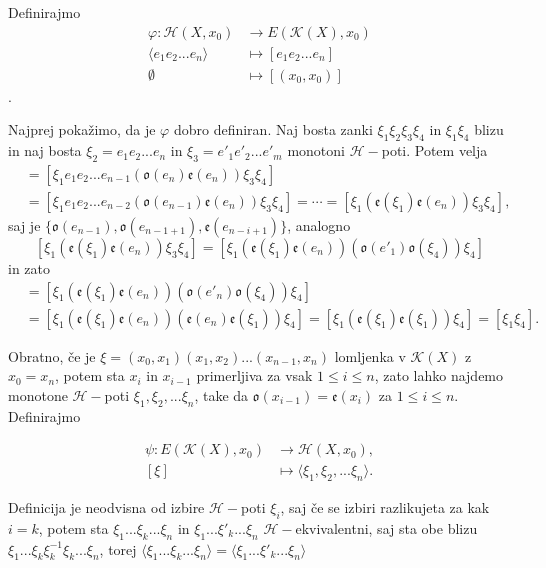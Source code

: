 \documentclass[mat1]{fmfdelo}
\DeclareRobustCommand{\k}{
    \mathcal{K}
}
\DeclareRobustCommand{\h}{
    \mathcal{H}
}
\begin{document}
\begin{dokaz}
    Definirajmo 
    \begin{align*}
\varphi:\mathscr{H}(X,x_0)&\rightarrow E(\k(X),x_0)\\
\langle e_1e_2...e_n\rangle&\mapsto [e_1e_2...e_n]\\
\emptyset &\mapsto [(x_0,x_0)]
    \end{align*}.

    Najprej pokažimo, da je $\varphi$ dobro definiran.
    Naj bosta zanki $\xi_1 \xi_2 \xi_3 \xi_4$ in $\xi_1 \xi_4 $ blizu in naj bosta $\xi_2 = e_1e_2...e_n$ in $\xi_3 = e'_1e'_2...e'_m$ monotoni $\h-$poti. Potem velja 
\begin{align*}
    [\xi_1 \xi_2 \xi_3 \xi_4]&=[\xi_1 e_1e_2...e_{n-1}(\mathfrak{o}(e_n)\mathfrak{e}(e_n)) \xi_3 \xi_4]\\
    &=[\xi_1 e_1e_2...e_{n-2}(\mathfrak{o}(e_{n-1})\mathfrak{e}(e_n)) \xi_3 \xi_4]=\cdots=[\xi_1(\mathfrak{e}(\xi_1)\mathfrak{e}(e_n)) \xi_3 \xi_4],
\end{align*}
saj je $\{\mathfrak{o}(e_{n-1}),\mathfrak{o}(e_{n-1+1}),\mathfrak{e}(e_{n-i+1})\}$, analogno 
$$
[\xi_1(\mathfrak{e}(\xi_1)\mathfrak{e}(e_n)) \xi_3 \xi_4]=[\xi_1(\mathfrak{e}(\xi_1)\mathfrak{e}(e_n))( \mathfrak{o}(e'_1)\mathfrak{o}(\xi_4)) \xi_4]
$$
in zato 
\begin{align*}
    [\xi_1 \xi_2 \xi_3 \xi_4]&=[\xi_1(\mathfrak{e}(\xi_1)\mathfrak{e}(e_n)) (\mathfrak{o}(e'_n)\mathfrak{o}(\xi_4)) \xi_4]\\
    &=[\xi_1(\mathfrak{e}(\xi_1)\mathfrak{e}(e_n)) (\mathfrak{e}(e_n)\mathfrak{e}(\xi_1)) \xi_4]=[\xi_1(\mathfrak{e}(\xi_1) \mathfrak{e}(\xi_1)) \xi_4]=[\xi_1 \xi_4].
\end{align*}


Obratno, če je $\xi =(x_0,x_1)(x_1,x_2)...(x_{n-1},x_n)$ lomljenka v $\k(X)$ z $x_0=x_n$, potem sta $x_i$ in $x_{i-1}$ primerljiva za vsak $1\leq i \leq n$, zato lahko najdemo monotone $\h-$poti $\xi_1, \xi_2,... \xi_n$, take da $\mathfrak{o}(x_{i-1})=\mathfrak{e}(x_i)$ za $1\leq i \leq n$. Definirajmo

\begin{align*}
    \psi: E(\k(X),x_0)&\rightarrow \mathscr{H}(X,x_0),\\
    [\xi]&\mapsto \langle\xi_1, \xi_2,... \xi_n\rangle.
\end{align*}

Definicija je neodvisna od izbire $\h-$poti $\xi_i$, saj če se izbiri razlikujeta za kak $i=k$, potem sta $\xi_1...\xi_k...\xi_n$ in $\xi_1...\xi'_k...\xi_n$ $\h-$ekvivalentni, saj sta obe blizu $\xi_1...\xi_k\xi_k^{-1}\xi_k...\xi_n$, torej $\langle \xi_1...\xi_k...\xi_n \rangle = \langle \xi_1...\xi'_k...\xi_n \rangle$


\end{dokaz}
\end{document}

